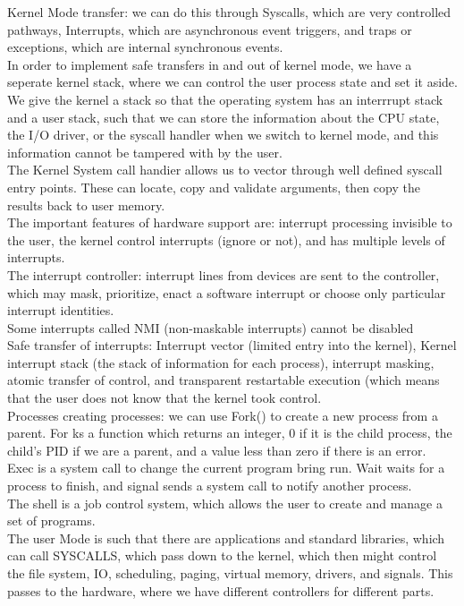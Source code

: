\documentclass[paper=a4, fontsize=11pt]{scrartcl} %
\numberwithin{equation}{section} %
\numberwithin{figure}{section} %
\numberwithin{table}{section} %
\begin{document}
Kernel Mode transfer: we can do this through Syscalls, which are very controlled pathways, Interrupts, which are asynchronous event triggers, and traps or exceptions, which are internal synchronous events.\\
In order to implement safe transfers in and out of kernel mode, we have a seperate kernel stack, where we can control the user process state and set it aside. \\
We give the kernel a stack so that the operating system has an interrrupt stack and a user stack, such that we can store the information about the CPU state, the I/O driver, or the syscall handler when we switch to kernel mode, and this information cannot be tampered with by the user. \\
The Kernel System call handier allows us to vector through well defined syscall entry points. These can locate, copy and validate arguments, then copy the results back to user memory. \\
The important features of hardware support are: interrupt processing invisible to the user, the kernel control interrupts (ignore or not), and has multiple levels of interrupts. \\
The interrupt controller: interrupt lines from devices are sent to the controller, which may mask, prioritize, enact a software interrupt or choose only particular interrupt identities. \\ 
Some interrupts called NMI (non-maskable interrupts) cannot be disabled\\
Safe transfer of interrupts: Interrupt vector (limited entry into the kernel), Kernel interrupt stack (the stack of information for each process), interrupt masking, atomic transfer of control, and transparent restartable execution (which means that the user does not know that the kernel took control. \\
Processes creating processes: we can use Fork() to create a new process from a parent. For ks a function which returns an integer, 0 if it is the child process, the child's PID if we are a parent, and a value less than zero if there is an error. \\
Exec is a system call to change the current program bring run. Wait waits for a process to finish, and signal sends a system call to notify another process. \\
The shell is a job control system, which allows the user to create and manage a set of programs. \\
The user Mode is such that there are applications and standard libraries, which can call SYSCALLS, which pass down to the kernel, which then might control the file system, IO, scheduling, paging, virtual memory, drivers, and signals. This passes to the hardware, where we have different controllers for different parts. \\
\end{document}
